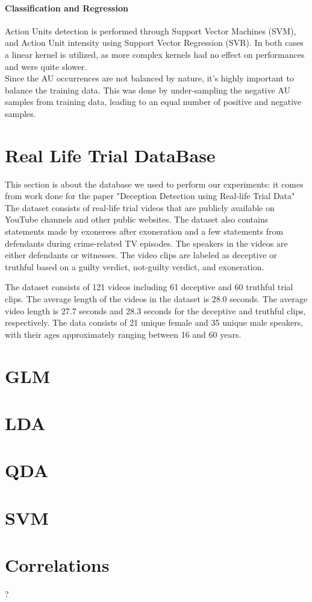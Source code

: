 \paragraph{Classification and Regression}
Action Units detection is performed through Support Vector Machines (SVM), and Action Unit intensity using Support Vector Regression (SVR). In both cases a linear kernel is utilized, as more complex kernels had no effect on performances and were quite slower. \\
Since the AU occurrences are not balanced by nature, it's highly important to balance the training data. This was done by under-sampling the negative AU samples from training data, leading to an equal number of positive and negative samples.\\

\section{Real Life Trial DataBase} \label{rldb}
This section is about the database we used to perform our experiments: it comes from work done for the paper "Deception Detection using Real-life Trial Data" \cite{Perez-Rosas:2015:DDU:2818346.2820758} \\

The dataset consists of real-life trial videos that are publicly available on YouTube channels and other public websites. The dataset also contains statements made by exonerees after exoneration and a few statements from defendants during crime-related TV episodes. The speakers in the videos are either defendants or witnesses. The video clips are labeled as deceptive or truthful based on a guilty verdict, not-guilty verdict, and exoneration. 

The dataset consists of 121 videos including 61 deceptive and 60 truthful trial clips. The average length of the videos in the dataset is 28.0 seconds. The average video length is 27.7 seconds and 28.3 seconds for the deceptive and truthful clips, respectively. The data consists of 21 unique female and 35 unique male speakers, with their ages approximately ranging between 16 and 60 years.

\section{GLM}

\section{LDA}

\section{QDA}

\section{SVM}

\section{Correlations} ?